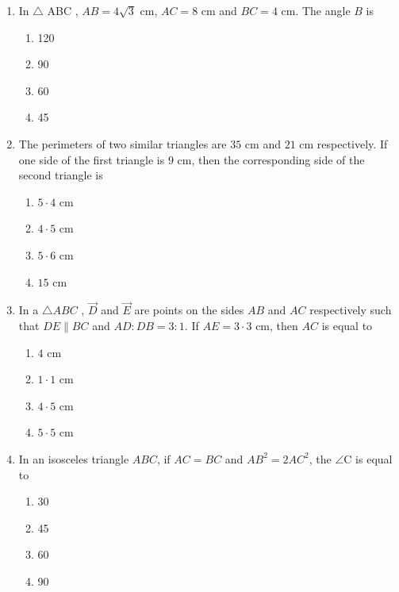 \begin{enumerate}
\begin{enumerate}[label=(\roman*)]
        \item In $\triangle$ ABC , $AB=4\sqrt{3}$ cm, $AC=8$ cm and $BC=4$ cm. The angle $B$ is

        \begin{enumerate}[label=(\Alph*)]
            \item 120\textdegree
            \item 90\textdegree
            \item 60\textdegree
            \item 45\textdegree
        \end{enumerate}
         
        \item The perimeters of two similar triangles are $35$ cm and $21$ cm respectively.  If one side of the first triangle is $9$ cm, then the corresponding side of the second triangle is 
        
         \begin{enumerate}[label=(\Alph*)]
            \item $5\cdot4$ cm
            \item $4\cdot5$ cm
            \item $5\cdot6$ cm
            \item $15$ cm
        \end{enumerate}
        
        \item In a $\triangle ABC$ , $\vec{D}$ and $\vec{E}$ are points on the sides $AB$ and $AC$ respectively such that $DE\parallel BC$ and $AD:DB=3:1$. If $AE=3\cdot3 $ cm, then $AC$ is equal to
        \begin{enumerate}[label=(\Alph*)]
            \item $4$ cm
            \item $1\cdot1$ cm
            \item $4\cdot5$ cm
            \item $5\cdot5$ cm
        \end{enumerate}
        
        \item In an isosceles triangle $ABC$, if $AC=BC$ and $AB^2=2AC^2$, the $\angle$C is equal to
        \begin{enumerate}[label=(\Alph*)]
            \item 30\textdegree
            \item 45\textdegree
            \item 60\textdegree
            \item 90\textdegree
        \end{enumerate}
        \end{enumerate}
\end{enumerate}
